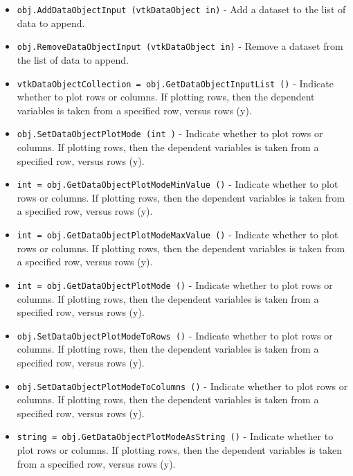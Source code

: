 \begin{itemize}
\item  \verb|obj.AddDataObjectInput (vtkDataObject in)| -  Add a dataset to the list of data to append.

\item  \verb|obj.RemoveDataObjectInput (vtkDataObject in)| -  Remove a dataset from the list of data to append.

\item  \verb|vtkDataObjectCollection = obj.GetDataObjectInputList ()| -  Indicate whether to plot rows or columns. If plotting rows, then
 the dependent variables is taken from a specified row,
 versus rows (y). 

\item  \verb|obj.SetDataObjectPlotMode (int )| -  Indicate whether to plot rows or columns. If plotting rows, then
 the dependent variables is taken from a specified row,
 versus rows (y). 

\item  \verb|int = obj.GetDataObjectPlotModeMinValue ()| -  Indicate whether to plot rows or columns. If plotting rows, then
 the dependent variables is taken from a specified row,
 versus rows (y). 

\item  \verb|int = obj.GetDataObjectPlotModeMaxValue ()| -  Indicate whether to plot rows or columns. If plotting rows, then
 the dependent variables is taken from a specified row,
 versus rows (y). 

\item  \verb|int = obj.GetDataObjectPlotMode ()| -  Indicate whether to plot rows or columns. If plotting rows, then
 the dependent variables is taken from a specified row,
 versus rows (y). 

\item  \verb|obj.SetDataObjectPlotModeToRows ()| -  Indicate whether to plot rows or columns. If plotting rows, then
 the dependent variables is taken from a specified row,
 versus rows (y). 

\item  \verb|obj.SetDataObjectPlotModeToColumns ()| -  Indicate whether to plot rows or columns. If plotting rows, then
 the dependent variables is taken from a specified row,
 versus rows (y). 

\item  \verb|string = obj.GetDataObjectPlotModeAsString ()| -  Indicate whether to plot rows or columns. If plotting rows, then
 the dependent variables is taken from a specified row,
 versus rows (y). 


\end{itemize}

